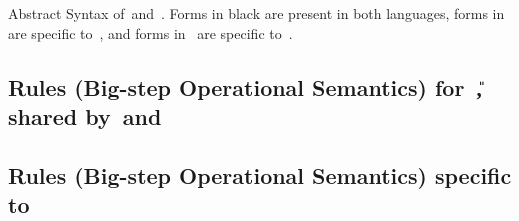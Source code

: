 \documentclass[manuscript,screen, 12pt, nonacm]{acmart}
\begin{document}
\begin{table}[H]
  \utable
  \caption{Abstract Syntax of~\VMinus and~\D. Forms in black are present in both
              languages, forms in~ are specific to~\VMinus, and forms
              in~ are specific to~\D.}
  \label{fig:unilang2}
\end{table}

\subsection{Rules (Big-step Operational Semantics) for~\U, shared by~\VMinus and~\D}
\label{usemantics1}
\usemantics 
\subsection{Rules (Big-step Operational Semantics) specific to~\VMinus}
\label{vmsemantics2}
\vmsemantics
\label{dsemantics2}
\dsemantics

\end{document}

